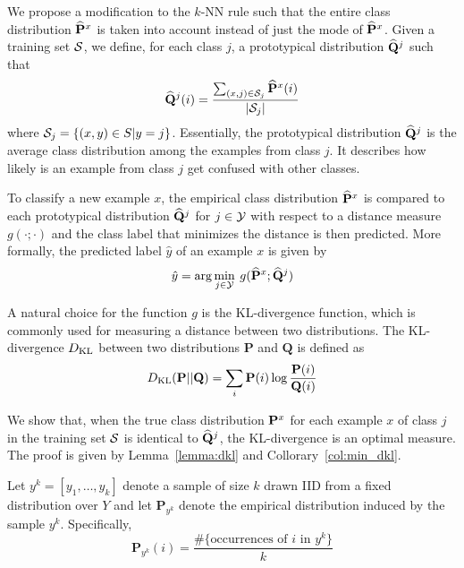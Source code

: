 \documentclass{article}
\begin{document}
We propose a modification to the $k$-NN rule such that the entire
class distribution $\widehat{\mathbf{P}}^x$ is taken into account instead of just the
mode of $\widehat{\mathbf{P}}^x$. Given a training set $\mathcal{S}$, we define,
for each class $j$, a prototypical distribution $\widehat{\mathbf{Q}}^j$ such that
\[
\widehat{\mathbf{Q}}^j(i) = \frac{\sum_{(x,j) \in \mathcal{S}_j} \widehat{\mathbf{P}}^x(i)}{|\mathcal{S}_j|}
\]
where $\mathcal{S}_j = \{ (x,y) \in S | y = j \}$. Essentially, the
prototypical distribution $\widehat{\mathbf{Q}}^j$ is the average class distribution
among the examples from class $j$. It describes how likely is an
example from class $j$ get confused with other classes.

To classify a new example $x$, the empirical class distribution $\widehat{\mathbf{P}}^x$ is
compared to each prototypical distribution $\widehat{\mathbf{Q}}^j$ for $j \in \mathcal{Y}$ with
respect to a distance measure $g(\cdot ; \cdot)$ and the class label that
minimizes the distance is then predicted. More formally, the predicted
label $\hat{y}$ of an example $x$ is given by
\[
\hat{y} = \arg\min_{j \in \mathcal{Y}} \: g(\widehat{\mathbf{P}}^x ; \widehat{\mathbf{Q}}^j)
\]

A natural choice for the function $g$ is the KL-divergence function,
which is commonly used for measuring a distance between two
distributions. The KL-divergence $D_{\mathrm{KL}}$ between two distributions
$\mathbf{P}$ and $\mathbf{Q}$ is defined as
\[
D_{\mathrm{KL}}(\mathbf{P} || \mathbf{Q}) = \sum_i \mathbf{P}(i) \log \frac{\mathbf{P}(i)}{\mathbf{Q}(i)}
\]

We show that, when the true class distribution $\mathbf{P}^x$ for each
example $x$ of class $j$ in the training set $\mathcal{S}$ is identical
to $\widehat{\mathbf{Q}}^j$, the KL-divergence is an optimal measure. The proof is
given by Lemma~\ref{lemma:dkl} and Collorary~\ref{col:min_dkl}. 

\newcommand{\sampleYK}{y^k}
\newcommand{\sampleEmpDist}{\mathbf{P}_{y^k}}
\newcommand{\Q}{\mathbf{Q}}

Let $\sampleYK = [y_1, \ldots, y_k]$ denote a sample of size $k$ drawn IID
from a fixed distribution over $Y$ and let $\sampleEmpDist$ denote the
empirical distribution induced by the sample
$\sampleYK$. Specifically,
\[
\sampleEmpDist(i) = \frac{\#\{ \mbox{occurrences of } i \mbox{ in } y^k\}}{k}
\]
\end{document}

